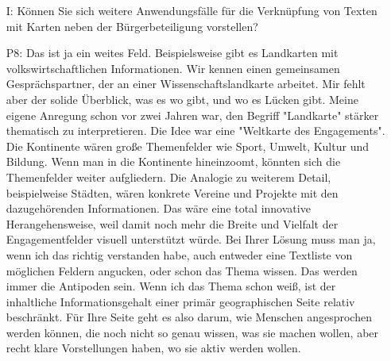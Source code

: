 \begin{itemize}
    \item[I:] K{\"o}nnen Sie sich weitere Anwendungsf{\"a}lle f{\"u}r die Verkn{\"u}pfung von Texten mit Karten neben der B{\"u}rgerbeteiligung vorstellen?
    \item[P8:] Das ist ja ein weites Feld. Beispielsweise gibt es Landkarten mit volkswirtschaftlichen Informationen. Wir kennen einen gemeinsamen Gespr{\"a}chspartner, der an einer Wissenschaftslandkarte arbeitet. Mir fehlt aber der solide {\"U}berblick, was es wo gibt, und wo es L{\"u}cken gibt. Meine eigene Anregung schon vor zwei Jahren war, den Begriff "Landkarte" st{\"a}rker thematisch zu interpretieren. Die Idee war eine "Weltkarte des Engagements". Die Kontinente w{\"a}ren gro{\ss}e Themenfelder wie Sport, Umwelt, Kultur und Bildung. Wenn man in die Kontinente hineinzoomt, k{\"o}nnten sich die Themenfelder weiter aufgliedern. Die Analogie zu weiterem Detail, beispielweise St{\"a}dten, w{\"a}ren konkrete Vereine und Projekte mit den dazugeh{\"o}renden Informationen. Das w{\"a}re eine total innovative Herangehensweise, weil damit noch mehr die Breite und Vielfalt der Engagementfelder visuell unterst{\"u}tzt w{\"u}rde. Bei Ihrer L{\"o}sung muss man ja, wenn ich das richtig verstanden habe, auch entweder eine Textliste von m{\"o}glichen Feldern angucken, oder schon das Thema wissen. Das werden immer die Antipoden sein. Wenn ich das Thema schon wei{\ss}, ist der inhaltliche Informationsgehalt einer prim{\"a}r geographischen Seite relativ beschr{\"a}nkt. F{\"u}r Ihre Seite geht es also darum, wie Menschen angesprochen werden k{\"o}nnen, die noch nicht so genau wissen, was sie machen wollen, aber recht klare Vorstellungen haben, wo sie aktiv werden wollen.
\end{itemize}

